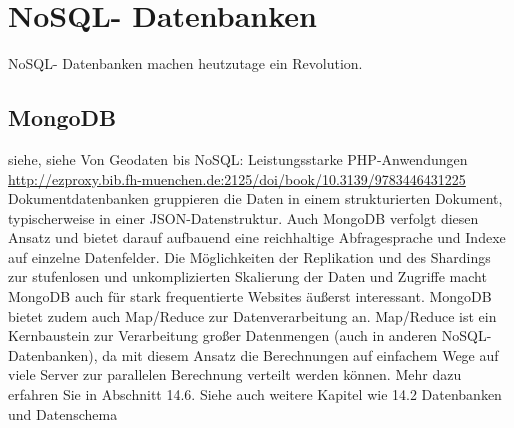 \chapter{NoSQL- Datenbanken}
NoSQL- Datenbanken machen heutzutage ein Revolution.
\section{MongoDB}
siehe\cite{Hollosi.2012}, siehe \cite{LloretIvorra.2013} Von Geodaten bis NoSQL: Leistungsstarke PHP-Anwendungen \url{http://ezproxy.bib.fh-muenchen.de:2125/doi/book/10.3139/9783446431225}\newline
Dokumentdatenbanken gruppieren die Daten in einem strukturierten Dokument, typischerweise in einer JSON-Datenstruktur. Auch MongoDB verfolgt diesen Ansatz und bietet darauf aufbauend eine reichhaltige Abfragesprache und Indexe auf einzelne Datenfelder. Die Möglichkeiten der Replikation und des Shardings zur stufenlosen und unkomplizierten Skalierung der Daten und Zugriffe macht MongoDB auch für stark frequentierte Websites äußerst interessant.
\newline
\newline
MongoDB bietet zudem auch Map/Reduce zur Datenverarbeitung an. Map/Reduce ist ein Kernbaustein zur Verarbeitung großer Datenmengen (auch in anderen NoSQL-Datenbanken), da mit diesem Ansatz die Berechnungen auf einfachem Wege auf viele Server zur parallelen Berechnung verteilt werden können. Mehr dazu erfahren Sie in Abschnitt 14.6. Siehe auch weitere Kapitel wie 14.2 Datenbanken und Datenschema



